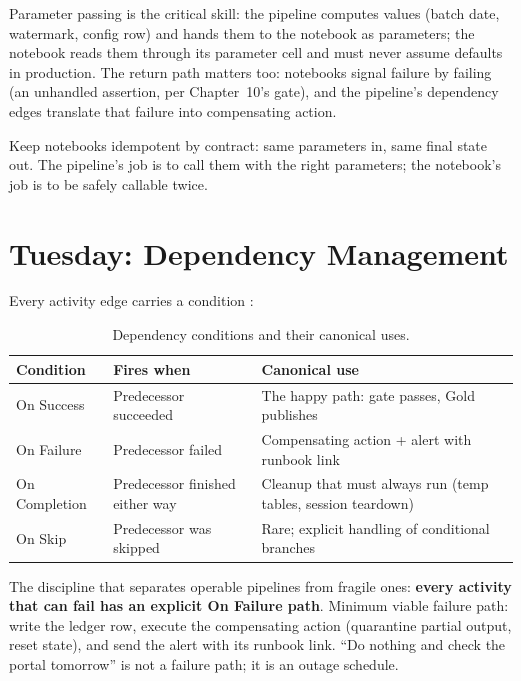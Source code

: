 Parameter passing is the critical skill: the pipeline computes values (batch date, watermark, config row) and hands them to the notebook as parameters; the notebook reads them through its parameter cell and must never assume defaults in production. The return path matters too: notebooks signal failure by failing (an unhandled assertion, per Chapter~10's gate), and the pipeline's dependency edges translate that failure into compensating action.

\begin{tipbox}
Keep notebooks idempotent by contract: same parameters in, same final state out. The pipeline's job is to call them with the right parameters; the notebook's job is to be safely callable twice.
\end{tipbox}

\section{Tuesday: Dependency Management}
Every activity edge carries a condition \cite{microsoftFabricPipelines}:

\begin{table}[H]
\centering
\small
\begin{tabular}{@{}p{3.2cm}p{5.0cm}p{5.6cm}@{}}
\toprule
\textbf{Condition} & \textbf{Fires when} & \textbf{Canonical use} \\
\midrule
On Success & Predecessor succeeded & The happy path: gate passes, Gold publishes \\
On Failure & Predecessor failed & Compensating action + alert with runbook link \\
On Completion & Predecessor finished either way & Cleanup that must always run (temp tables, session teardown) \\
On Skip & Predecessor was skipped & Rare; explicit handling of conditional branches \\
\bottomrule
\end{tabular}
\caption{Dependency conditions and their canonical uses.}
\label{tab:chapter12-dependencies}
\end{table}

The discipline that separates operable pipelines from fragile ones: \textbf{every activity that can fail has an explicit On Failure path}. Minimum viable failure path: write the ledger row, execute the compensating action (quarantine partial output, reset state), and send the alert with its runbook link. ``Do nothing and check the portal tomorrow'' is not a failure path; it is an outage schedule.

